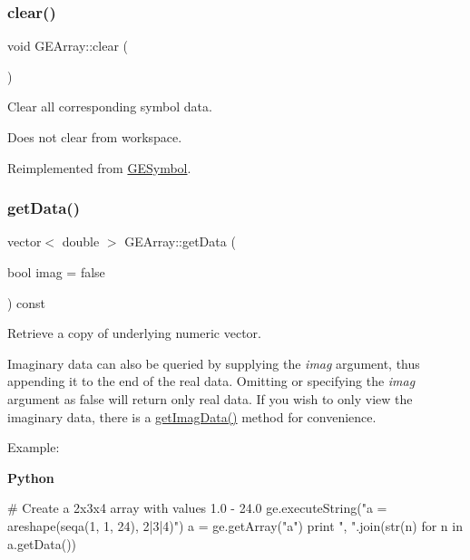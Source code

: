 \subsubsection{\texorpdfstring{clear()}{clear()}}
{\footnotesize\ttfamily void G\+E\+Array\+::clear (\begin{DoxyParamCaption}{ }\end{DoxyParamCaption})\hspace{0.3cm}{\ttfamily [virtual]}}



Clear all corresponding symbol data. 

Does not clear from workspace. 

Reimplemented from \hyperlink{class_g_e_symbol_a39d2e523aec771a73e1cc5d7a9618b88}{G\+E\+Symbol}.

\mbox{\label{class_g_e_array_a5489786a71cad6eb7482658564bac5f2}} 
\subsubsection{\texorpdfstring{get\+Data()}{getData()}}
{\footnotesize\ttfamily vector$<$ double $>$ G\+E\+Array\+::get\+Data (\begin{DoxyParamCaption}\item[{bool}]{imag = {\ttfamily false} }\end{DoxyParamCaption}) const}



Retrieve a copy of underlying numeric vector. 

Imaginary data can also be queried by supplying the {\itshape imag} argument, thus appending it to the end of the real data. Omitting or specifying the {\itshape imag} argument as {\ttfamily false} will return only real data. If you wish to only view the imaginary data, there is a \hyperlink{class_g_e_array_a13a837cc6784562be80f64e4aa3ce4a5}{get\+Imag\+Data()} method for convenience.

Example\+:

{\bfseries Python} 
\begin{DoxyCode}
\textcolor{comment}{# Create a 2x3x4 array with values 1.0 - 24.0}
ge.executeString(\textcolor{stringliteral}{"a = areshape(seqa(1, 1, 24), 2|3|4)"})
a = ge.getArray(\textcolor{stringliteral}{"a"})
\textcolor{keywordflow}{print} \textcolor{stringliteral}{", "}.join(str(n) \textcolor{keywordflow}{for} n \textcolor{keywordflow}{in} a.getData())
\end{DoxyCode}


